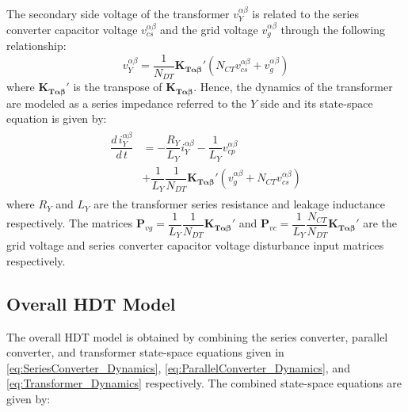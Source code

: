 The secondary side voltage of the transformer $v_Y^{\alpha\beta}$ is related to the series converter capacitor voltage $v_{cs}^{\alpha\beta}$ and the grid voltage $v_g^{\alpha\beta}$ through the following relationship:
\begin{equation}
    v_Y^{\alpha\beta} = \dfrac{1}{N_{DT}} \mathbf{K_{T\alpha\beta}}'(N_{CT}v_{cs}^{\alpha\beta} + v_g^{\alpha\beta})
\end{equation}
where $\mathbf{K_{T\alpha\beta}}'$ is the transpose of $\mathbf{K_{T\alpha\beta}}$. Hence, the dynamics of the transformer are modeled as a series impedance referred to the $Y$ side and its state-space equation is given by:
\begin{align}
    \begin{aligned}
        \dfrac{d\,i_Y^{\alpha\beta}}{d\,t} &= -\dfrac{R_Y}{L_Y}i_Y^{\alpha\beta} - \dfrac{1}{L_Y}v_{cp}^{\alpha\beta}\\
        &+ \dfrac{1}{L_Y}\dfrac{1}{N_{DT}} \mathbf{K_{T\alpha\beta}}' (v_g^{\alpha\beta} + N_{CT}v_{cs}^{\alpha\beta}) \label{eq:Transformer_Dynamics}
    \end{aligned}
\end{align}
where $R_Y$ and $L_Y$ are the transformer series resistance and leakage inductance respectively. The matrices $\mathbf{P}_{vg} = \dfrac{1}{L_Y}\dfrac{1}{N_{DT}} \mathbf{K_{T\alpha\beta}}'$ and $\mathbf{P}_{vc} = \dfrac{1}{L_Y}\dfrac{N_{CT}}{N_{DT}} \mathbf{K_{T\alpha\beta}}'$ are the grid voltage and series converter capacitor voltage disturbance input matrices respectively.

\subsection{Overall HDT Model}

The overall HDT model is obtained by combining the series converter, parallel converter, and transformer state-space equations given in \eqref{eq:SeriesConverter_Dynamics}, \eqref{eq:ParallelConverter_Dynamics}, and \eqref{eq:Transformer_Dynamics} respectively. The combined state-space equations are given by:

